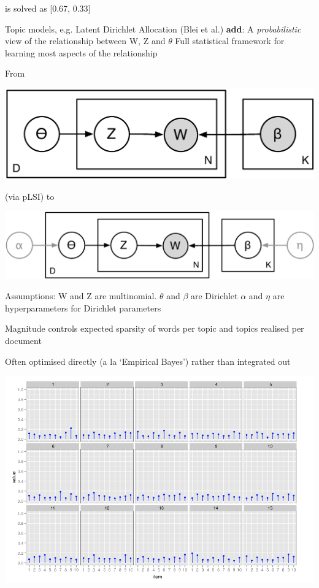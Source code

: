 \documentclass{mediumfoils}
\begin{document}
is solved as [0.67, 0.33]


Topic models, e.g. Latent Dirichlet Allocation (Blei et al.) \textbf{add}:
\ita
\itm A \textit{probabilistic} view of the relationship between W, Z and $\theta$ 
\itm Full statistical framework for learning most aspects of the relationship
\itz


From

\centerline{\includegraphics[scale=.8]{pictures/new-topics-ca}}

(via pLSI) to

\centerline{\includegraphics[scale=.8]{pictures/lda-flat}}


Assumptions:
\ita
\itm W and Z are multinomial.  
\itm $\theta$ and $\beta$ are Dirichlet 
\itm $\alpha$ and $\eta$ are hyperparameters for Dirichlet parameters
\ita
\item Magnitude controls expected sparsity of words per topic and topics realised per document
\item Often optimised directly (a la `Empirical Bayes') rather than integrated out
\itz
\itz


\centerline{\includegraphics[scale=1]{pictures/dirichlet-alpha10}}
\end{document}
